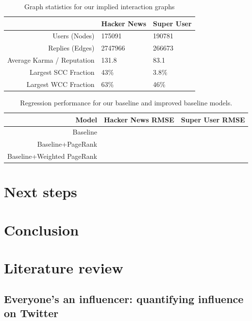 \documentclass[10pt]{article}
\begin{document}
\begin{table}[h]
\begin{center}
\begin{tabular}{| r | l l |}
\hline
& \textbf{Hacker News} & \textbf{Super User} \\
\hline
Users (Nodes) & 175091 & 190781 \\
Replies (Edges) & 2747966 & 266673 \\
Average Karma / Reputation & 131.8 & 83.1 \\
Largest SCC Fraction & 43\% & 3.8\% \\
Largest WCC Fraction & 63\% & 46\% \\
\hline
\end{tabular}
\end{center}
\caption{Graph statistics for our implied interaction graphs}
\label{tab:graphstats}
\end{table}

\begin{table}[h]
\begin{center}
\begin{tabular}{| r | l l |}
\hline
Model & \textbf{Hacker News RMSE} & \textbf{Super User RMSE} \\
\hline
Baseline &  & \\
Baseline+PageRank & & \\
Baseline+Weighted PageRank & & \\
\hline
\end{tabular}
\end{center}
\caption{Regression performance for our baseline and improved baseline models.}
\label{tab:regression}
\end{table}

\section{Next steps}

\section{Conclusion}


\section{Literature review}
\subsection{Everyone's an influencer: quantifying influence on Twitter \citep{bakshy2011everyone}}
\end{document}
